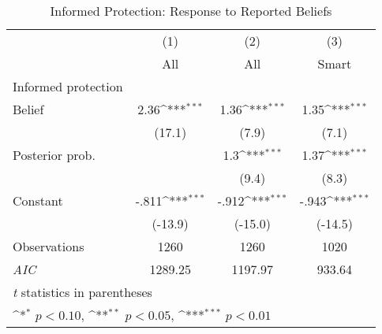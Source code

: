 \begin{table}[htbp]\centering
\def\sym#1{\ifmmode^{#1}\else\(^{#1}\)\fi}
\caption{Informed Protection: Response to Reported Beliefs}
\begin{tabular}{l*{3}{c}}
\hline\hline
                &\multicolumn{1}{c}{(1)}&\multicolumn{1}{c}{(2)}&\multicolumn{1}{c}{(3)}\\
                &\multicolumn{1}{c}{All}&\multicolumn{1}{c}{All}&\multicolumn{1}{c}{Smart}\\
\hline
Informed protection&                  &                  &                  \\
Belief          &     2.36\sym{***}&     1.36\sym{***}&     1.35\sym{***}\\
                &   (17.1)         &    (7.9)         &    (7.1)         \\
Posterior prob. &                  &      1.3\sym{***}&     1.37\sym{***}\\
                &                  &    (9.4)         &    (8.3)         \\
Constant        &    -.811\sym{***}&    -.912\sym{***}&    -.943\sym{***}\\
                &  (-13.9)         &  (-15.0)         &  (-14.5)         \\
\hline
Observations    &     1260         &     1260         &     1020         \\
\textit{AIC}    &  1289.25         &  1197.97         &   933.64         \\
\hline\hline
\multicolumn{4}{l}{\footnotesize \textit{t} statistics in parentheses}\\
\multicolumn{4}{l}{\footnotesize \sym{*} \(p<0.10\), \sym{**} \(p<0.05\), \sym{***} \(p<0.01\)}\\
\end{tabular}
\end{table}
